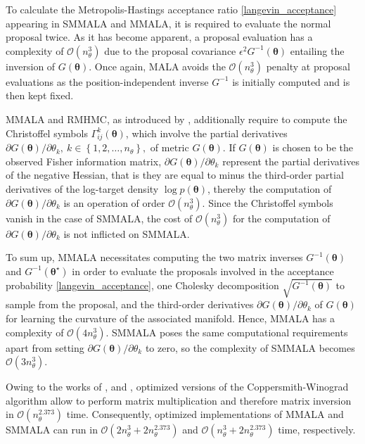 \documentclass[twoside,11pt]{article}
\begin{document}
To calculate the Metropolis-Hastings acceptance ratio \eqref{langevin_acceptance} appearing in SMMALA and MMALA,
it is required to evaluate the normal proposal twice. As it has become apparent, a proposal evaluation has a complexity of
$\mathcal{O}(n_\theta^3)$ due to the proposal covariance $\epsilon^2 G^{-1}(\boldsymbol{\theta})$ entailing the inversion of 
$G(\boldsymbol{\theta})$. Once again, MALA avoids the $\mathcal{O}(n_\theta^3)$ penalty at proposal evaluations as the
position-independent inverse $G^{-1}$ is initially computed and is then kept fixed.

MMALA and RMHMC, as introduced by \cite{gir_cal__rie}, additionally require to compute the Christoffel symbols 
$\Gamma^{k}_{ij}(\boldsymbol{\theta})$, which involve
the partial derivatives $\partial G(\boldsymbol{\theta})/\partial\theta_k,~k\in\left\{1,2,\dots,n_{\theta}\right\},$
of metric $G(\boldsymbol{\theta})$. If $G(\boldsymbol{\theta})$ is chosen to be the 
observed Fisher information matrix, $\partial G(\boldsymbol{\theta})/\partial\theta_k$ represent the partial derivatives of 
the negative Hessian, that is they are equal to minus the third-order partial derivatives of the log-target density 
$\log{p(\boldsymbol{\theta})}$, thereby the computation of $\partial G(\boldsymbol{\theta})/\partial\theta_k$ is an 
operation of order $\mathcal{O}(n_\theta^3)$. Since the Christoffel symbols vanish in the case of SMMALA, the cost of
$\mathcal{O}(n_\theta^3)$ for the computation of $\partial G(\boldsymbol{\theta})/\partial\theta_k$ is not inflicted on
SMMALA.

To sum up, MMALA necessitates computing the two matrix inverses $G^{-1}(\boldsymbol{\theta})$ and 
$G^{-1}(\boldsymbol{\theta}^{\star})$ in order to evaluate the proposals involved in the acceptance probability 
\eqref{langevin_acceptance}, one Cholesky decomposition $\sqrt{G^{-1}(\boldsymbol{\theta})}$ to sample from the proposal, 
and the third-order derivatives $\partial G(\boldsymbol{\theta})/\partial\theta_k$ of $G(\boldsymbol{\theta})$
for learning the curvature of the associated manifold. Hence, MMALA has a complexity of $\mathcal{O}(4n_\theta^3)$. SMMALA
poses the same computational requirements apart from setting $\partial G(\boldsymbol{\theta})/\partial\theta_k$ to zero, so 
the complexity of SMMALA becomes $\mathcal{O}(3n_\theta^3)$.

Owing to the works of \cite{dav_sto__imp}, \cite{wil__brea} and \cite{leg__pow},
optimized versions of the Coppersmith-Winograd algorithm allow to perform matrix multiplication and therefore matrix 
inversion in $\mathcal{O}(n_\theta^{2.373})$ time. Consequently, optimized implementations of MMALA and SMMALA can run in
$\mathcal{O}(2n_\theta^3+2n_\theta^{2.373})$ and $\mathcal{O}(n_\theta^3+2n_\theta^{2.373})$ time, respectively.
\end{document}
